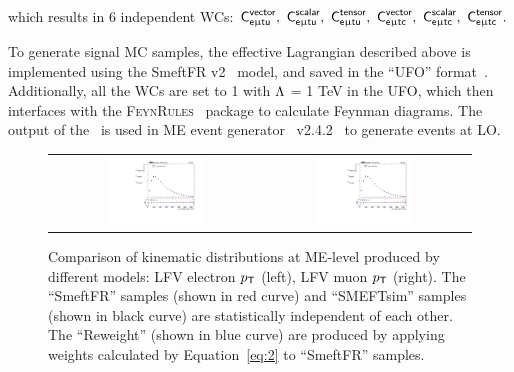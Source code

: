 which results in 6 independent \acp{WC}: $\textsf{C}^{\textsf{vector}}_{\textsf{e}\upmu\textsf{t{u}}},~\textsf{C}^{\textsf{scalar}}_{\textsf{e}\upmu\textsf{t{u}}},~\textsf{C}^{\textsf{tensor}}_{\textsf{e}\upmu\textsf{t{u}}},~\textsf{C}^{\textsf{vector}}_{\textsf{e}\upmu\textsf{t{c}}},~\textsf{C}^{\textsf{scalar}}_{\textsf{e}\upmu\textsf{t{c}}},~\textsf{C}^{\textsf{tensor}}_{\textsf{e}\upmu\textsf{t{c}}}.$  

To generate signal \ac{MC} samples, the effective Lagrangian described above is implemented using the SmeftFR v2~\cite{Dedes:2019uzs} model, and saved in the ``UFO'' format~\cite{Degrande:2011ua}. Additionally, all the \acp{WC} are set to 1 with $\mathrm{\Lambda}$ = 1 TeV in the UFO, which then interfaces with the \textsc{FeynRules}~\cite{Christensen:2008py} package to calculate Feynman diagrams. The output of the \FR~is used in \ac{ME} event generator \MG~v2.4.2~\cite{Alwall:2014hca} to generate events at \ac{LO}. 

\begin{figure}[tbh!]
 \begin{center}
 \begin{tabular}{cc}
  \includegraphics[width=0.48\textwidth]{figures/Part3/Samples/LFVePt}&
    \includegraphics[width=0.48\textwidth]{figures/Part3/Samples/LFVmuPt}\\
 \end{tabular}
 \caption{Comparison of kinematic distributions at \ac{ME}-level produced by different models: LFV electron $p_{\textsf{T}}$ (left), LFV muon $p_{\textsf{T}}$ (right). The ``SmeftFR'' samples (shown in red curve) and  ``SMEFTsim'' samples (shown in black curve) are statistically independent of each other. The ``Reweight'' (shown in blue curve) are produced by applying weights calculated by Equation~\ref{eq:2} to ``SmeftFR'' samples.}
 \label{fig:reweight}
 \end{center}
\end{figure}

